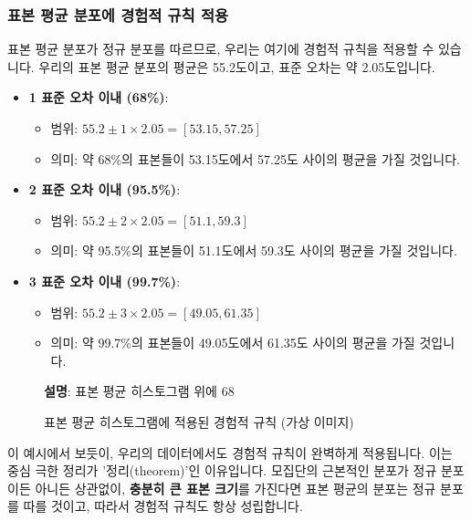 \documentclass[11pt,a4paper]{book}
\theoremstyle{definition}
\begin{document}
\subsubsection*{표본 평균 분포에 경험적 규칙 적용}

표본 평균 분포가 정규 분포를 따르므로, 우리는 여기에 경험적 규칙을 적용할 수 있습니다. 우리의 표본 평균 분포의 평균은 55.2도이고, 표준 오차는 약 2.05도입니다.

\begin{itemize}
    \item \textbf{1 표준 오차 이내 (68\%)}:
    \begin{itemize}
        \item 범위: $55.2 \pm 1 \times 2.05 = [53.15, 57.25]$
        \item 의미: 약 68\%의 표본들이 53.15도에서 57.25도 사이의 평균을 가질 것입니다.
    \end{itemize}
    \item \textbf{2 표준 오차 이내 (95.5\%)}:
    \begin{itemize}
        \item 범위: $55.2 \pm 2 \times 2.05 = [51.1, 59.3]$
        \item 의미: 약 95.5\%의 표본들이 51.1도에서 59.3도 사이의 평균을 가질 것입니다.
    \end{itemize}
    \item \textbf{3 표준 오차 이내 (99.7\%)}:
    \begin{itemize}
        \item 범위: $55.2 \pm 3 \times 2.05 = [49.05, 61.35]$
        \item 의미: 약 99.7\%의 표본들이 49.05도에서 61.35도 사이의 평균을 가질 것입니다.
    \end{itemize}
\end{itemize}

\begin{figure}[h!]
    \centering
    \caption{표본 평균 히스토그램에 적용된 경험적 규칙 (가상 이미지)}
    \label{fig:excel_empirical}
    \textbf{설명}: 표본 평균 히스토그램 위에 68%
\end{figure}

\begin{warningbox}[title={경험적 규칙의 보편성}]
이 예시에서 보듯이, 우리의 데이터에서도 경험적 규칙이 완벽하게 적용됩니다. 이는 중심 극한 정리가 '정리(theorem)'인 이유입니다. 모집단의 근본적인 분포가 정규 분포이든 아니든 상관없이, \textbf{충분히 큰 표본 크기}를 가진다면 표본 평균의 분포는 정규 분포를 따를 것이고, 따라서 경험적 규칙도 항상 성립합니다.
\end{warningbox}
\end{document}

